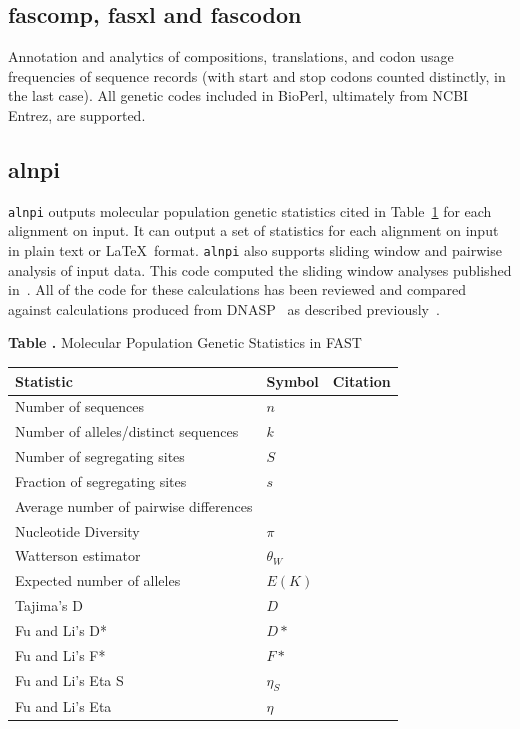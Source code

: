 \documentclass{frontiersSCNS} %
\begin{document}
\subsection{fascomp, fasxl and fascodon}

Annotation and analytics of compositions, translations, and codon
usage frequencies of sequence records (with start and stop codons
counted distinctly, in the last case). All genetic codes included in
BioPerl, ultimately from NCBI Entrez, are supported.

\subsection{alnpi}
    
{\tt alnpi} outputs molecular population genetic statistics cited in
Table~\ref{tab:pgstats} for each alignment on input. It can output a
set of statistics for each alignment on input in plain text or
\LaTeX~format. {\tt alnpi} also supports sliding window and pairwise
analysis of input data. This code computed the sliding window analyses
published in~\citep{Ardell03}. All of the code for these calculations has
been reviewed and compared against calculations produced from
DNASP~\citep{Librado01062009} as described previously~\citep{Ardell12082004}.

\begin{table}[!t]
\textbf{\label{tab:pgstats} Table .}{
  Molecular Population Genetic Statistics in FAST }

\processtable{ }
{\begin{tabular}{lll}\toprule
    Statistic  & Symbol  & Citation \\
\midrule
Number of sequences & $n$ & \\
Number of alleles/distinct sequences & $k$ & \\
Number of segregating sites & $S$ & \\
Fraction of segregating sites & $s$ & \\
Average number of pairwise differences &  & \citep{NeiLi79} \\
Nucleotide Diversity & $\pi$ &  \citep{NeiLi79} \\
Watterson estimator & $\theta_W$ & \citep{watterson1975number} \\
Expected number of alleles & $E(K)$ & \citep{ewens1972sampling} \\
Tajima's D & $D$ & \citep{Tajima89c} \\
Fu and Li's D* & $D*$ & \citep{FuLi93b} \\
Fu and Li's F* & $F*$ & \citep{FuLi93b,SimonsenEtAl95} \\
Fu and Li's Eta S & $\eta_S$ &  \citep{FuLi93b} \\
Fu and Li's Eta & $\eta$ &  \citep{FuLi93b} \\
\end{tabular}}{}
\end{table}
\end{document}
